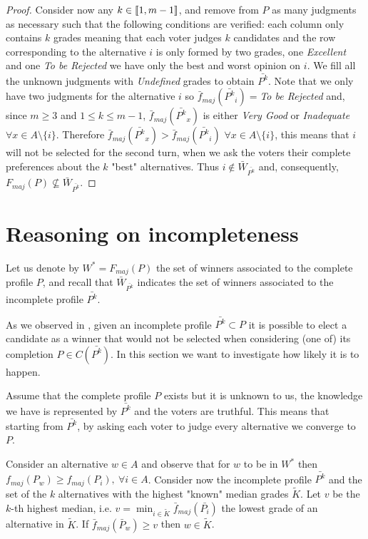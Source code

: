 \documentclass[version=3.21, pagesize, twoside=off, bibliography=totoc, DIV=calc, fontsize=12pt, a4paper]{scrartcl}
\begin{document}
\begin{proof}
	Consider now any $k \in \llbracket1,m-1\rrbracket$, and remove from $P$ as many judgments as necessary such that the following conditions are verified: each column only contains $k$ grades \textemdash meaning that each voter judges $k$ candidates \textemdash and the row corresponding to the alternative $i$ is only formed by two grades, one \textit{Excellent} and one \textit{To be Rejected} \textemdash we have only the best and worst opinion on $i$. We fill all the unknown judgments with \textit{Undefined} grades to obtain $\bar{P^k}$. Note that we only have two judgments for the alternative $i$ so $\bar{f}_{maj}(\bar{P^k}_i)=$\textit{To be Rejected} and, since $m\geq3$ and $1 \leq k \leq m-1$, $\bar{f}_{maj}(\bar{P^k}_x)$ is either \textit{Very Good} or \textit{Inadequate} $\forall x \in A \setminus \{i\}$. Therefore $\bar{f}_{maj}(\bar{P^k}_x) > \bar{f}_{maj}(\bar{P^k}_i)$ $\forall x \in A \setminus \{i\}$, this means that $i$ will not be selected for the second turn, when we ask the voters their complete preferences about the $k$ "best" alternatives. Thus $i \notin \bar{W}_{\bar{P^k}}$ and, consequently, $F_{maj}(P) \nsubseteq \bar{W}_{\bar{P^k}}$.
\end{proof}


\section{Reasoning on incompleteness}
Let us denote by $W^*=F_{maj}(P)$ the set of winners associated to the complete profile $P$, and recall that $\bar{W}_{\bar{P^k}}$ indicates the set of winners associated to the incomplete profile $\bar{P^k}$.

As we observed in , given an incomplete profile $\bar{P^k} \subset P$ it is possible to elect a candidate as a winner that would not be selected when considering (one of) its completion $P \in C(\bar{P^k})$. In this section we want to investigate how likely it is to happen.

Assume that the complete profile $P$ exists but it is unknown to us, the knowledge we have is represented by $\bar{P^k}$ and the voters are truthful. 
This means that starting from $\bar{P^k}$, by asking each voter to judge every alternative we converge to $P$.

Consider an alternative $w\in A$ and observe that for $w$ to be in $W^*$ then $f_{maj}(P_w)\geq f_{maj}(P_i), \ \forall i \in A$. 
Consider now the incomplete profile $\bar{P^k}$ and the set of the $k$ alternatives with the highest "known" median grades $\tilde{K}$. 
Let $v$ be the $k$-th highest median, i.e. $v=\min_{i\in \tilde{K}} \bar{f}_{maj}(\bar{P_i})$ the lowest grade of an alternative in $\tilde{K}$. If $\bar{f}_{maj}(\bar{P}_w) \geq v$ then $w \in \tilde{K}$. 
\end{document}

